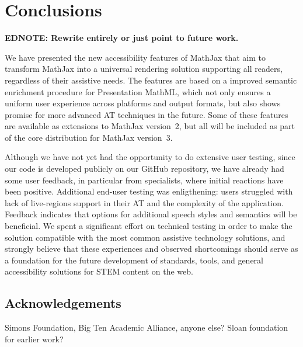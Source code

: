 \documentclass{sig-alternate}
\newcommand\edbf[1]{\typeout{There is still an editor's note!!!}%
  \textbf{EDNOTE: #1}}
\begin{document}
\section{Conclusions}
\label{sec:conc}

\edbf{Rewrite entirely or just point to future work.}

We have presented the new accessibility features of MathJax that aim to
transform MathJax into a universal rendering solution supporting all readers,
regardless of their assistive needs. The features are based on a improved semantic
enrichment procedure for Presentation MathML, which not only ensures a uniform
user experience across platforms and output formats, but also shows promise
for more advanced AT techniques in the future. Some of these features are available
as extensions to MathJax version~2, but all will be included as part of the core
distribution for MathJax version~3.


Although we have not yet had the opportunity to do extensive user testing, since
our code is developed publicly on our GitHub repository, we have already had
some user feedback, in particular from specialists, where initial reactions have
been positive. Additional end-user testing was enligthening: users struggled 
with lack of live-regions support in their AT and the complexity of the 
application. Feedback indicates that options for additional speech styles and 
semantics will be beneficial. 
We spent a significant effort on
technical testing in order to make the solution compatible with the most common
assistive technology solutions, and
strongly believe that these experiences and
observed shortcomings should serve as a foundation for the future development
of standards, tools, and general accessibility solutions for STEM content on the
web. 


\subsection*{Acknowledgements}
Simons Foundation, Big Ten Academic Alliance, anyone else?  Sloan foundation for earlier work?
\end{document}
